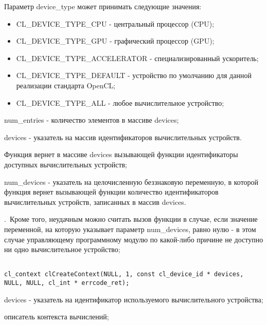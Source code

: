 \begin{enumerate}
{				Параметр device\_type может принимать следующие значения:

				\newcommand{\ndtl}[2]{\item CL\_DEVICE\_TYPE\_#1 - #2;}

				\begin{itemize}

					\ndtl{CPU}{центральный процессор (CPU)}
					\ndtl{GPU}{графический процессор (GPU)}
					\ndtl{ACCELERATOR}{специализированный ускоритель}
					\ndtl{DEFAULT}{устройство по умолчанию для данной реализации стандарта OpenCL}
					\ndtl{ALL}{любое вычислительное устройство}

				\end{itemize}

			\item num\_entries - количество элементов в массиве devices;
			\item devices - указатель на массив идентификаторов вычислительных устройств.
				
				Функция \openclfunc вернет в массиве devices вызывающей функции идентификаторы доступных вычислительных устройств;
					
			\item num\_devices - указатель на целочисленную беззнаковую переменную, в которой функция \openclfunc вернет вызывающей функции количество идентификаторов вычислительных устройств, записанных в массив devices.
		}
		{\openclsuccess.~Кроме того, неудачным можно считать вызов функции \openclfunc в случае, если значение переменной, на которую указывает параметр num\_devices, равно нулю - в этом случае управляющему программному модулю по какой-либо причине не доступно ни одно вычислительное устройство;}



\begin{lstlisting}

cl_context clCreateContext(NULL, 1, const cl_device_id * devices, NULL, NULL, cl_int * errcode_ret);

\end{lstlisting}

		\openclend
		{
			\item devices - указатель на идентификатор используемого вычислительного устройства;
			\errcode
		}
		{описатель контекста вычислений;}


\end{enumerate}
